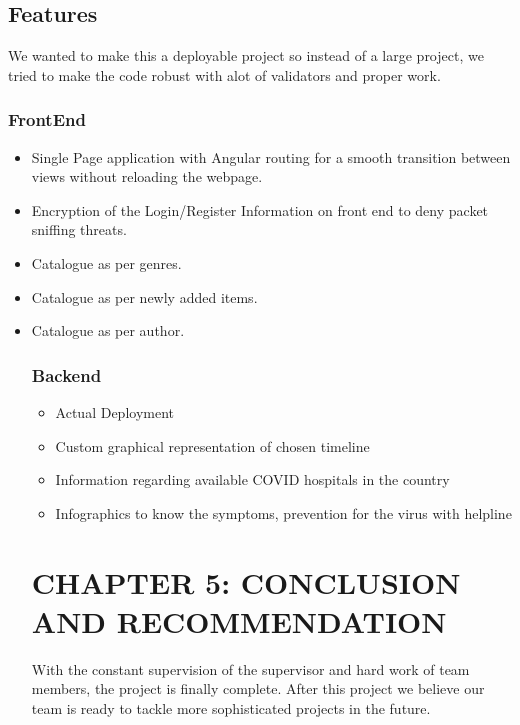\documentclass[12pt]{article}
\begin{document}
\subsection{Features}
We wanted to make this a deployable project so instead of a large project, we tried to make the code robust with alot of validators and proper work.

\subsubsection{FrontEnd}
\begin{itemize}
    \item Single Page application with Angular routing for a smooth transition between views without reloading the webpage.
    \item Encryption of the Login/Register Information on front end to deny packet sniffing threats.
    \item Catalogue as per genres.
    \item Catalogue as per newly added items.
    \item Catalogue as per author.
\subsubsection{Backend}
\begin{itemize}
    \item Actual Deployment 
    \item Custom graphical representation of chosen timeline
    \item Information regarding available COVID hospitals in the country
    \item Infographics to know the symptoms, prevention for the virus with helpline
\end{itemize}

\clearpage

\section{CHAPTER 5: CONCLUSION AND RECOMMENDATION}
With the constant supervision of the supervisor and hard work of team members, the project is finally complete. After this project we believe our team is 
ready to tackle more sophisticated projects in the future.


\end{itemize}
\end{document}
